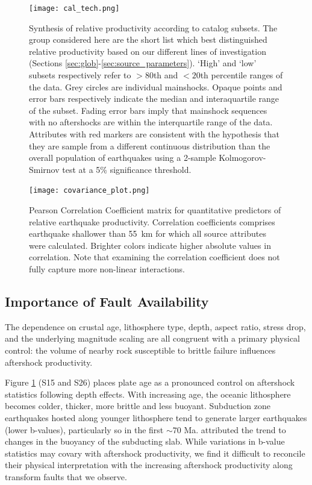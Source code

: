 \documentclass[draft, jgrga]{agujournal2018}
\begin{document}
 \begin{figure}
        \centering
        \texttt{[image: cal\_tech.png]}
        \caption{Synthesis of relative productivity according to catalog subsets. The group considered here are the short list which best distinguished relative productivity based on our different lines of investigation (Sections \ref{sec:glob}-\ref{sec:source_parameters}). `High' and `low' subsets respectively refer to $>80$th and $<20$th percentile ranges of the data. Grey circles are individual mainshocks. Opaque points and error bars respectively indicate the median and interaquartile range of the subset. Fading error bars imply that mainshock sequences with no aftershocks are within the interquartile range of the data. Attributes with red markers are consistent with the hypothesis that they are sample from a different continuous distribution than the overall population of earthquakes using a 2-sample Kolmogorov-Smirnov test at a 5\% significance threshold.}
        \label{fig:caltech}
    \end{figure}

 \begin{figure}
    \centering
    \texttt{[image: covariance\_plot.png]}
    \caption{Pearson Correlation Coefficient matrix for quantitative predictors of relative earthquake productivity. Correlation coefficients comprises earthquake shallower than 55~km for which all source attributes were calculated. Brighter colors indicate higher absolute values in correlation. Note that examining the correlation coefficient does not fully capture more non-linear interactions.}
    \label{fig:covariance}
\end{figure}

\subsection{Importance of Fault Availability}

The dependence on crustal age, lithosphere type, depth, aspect ratio, stress drop, and the underlying magnitude scaling are all congruent with a primary physical control: the volume of nearby rock susceptible to brittle failure influences aftershock productivity.

Figure \ref{fig:caltech} (S15 and S26) places plate age as a pronounced control on aftershock statistics following depth effects. With increasing age, the oceanic lithosphere becomes colder, thicker, more brittle and less buoyant. Subduction zone earthquakes hosted along younger lithosphere tend to generate larger earthquakes (lower b-values), particularly so in the first $\sim70$ Ma. \citet{Nishikawa2014EarthquakeBuoyancy} attributed the trend to changes in the buoyancy of the subducting slab. While variations in b-value statistics may covary with aftershock productivity, we find it difficult to reconcile their physical interpretation with the increasing aftershock productivity along transform faults that we observe.
\end{document}
